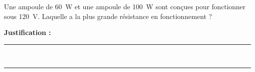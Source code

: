 Une ampoule de \qty{60}{W} et une ampoule de \qty{100}{W} sont conçues pour fonctionner sous \qty{120}{V}. Laquelle a la plus grande résistance en fonctionnement ?

\choices

\noindent\textbf{Justification :} \hrulefill \\[2.5ex]
\rule{\linewidth}{0.4pt} \\[2.5ex]
\rule{\linewidth}{0.4pt}
\vfill
